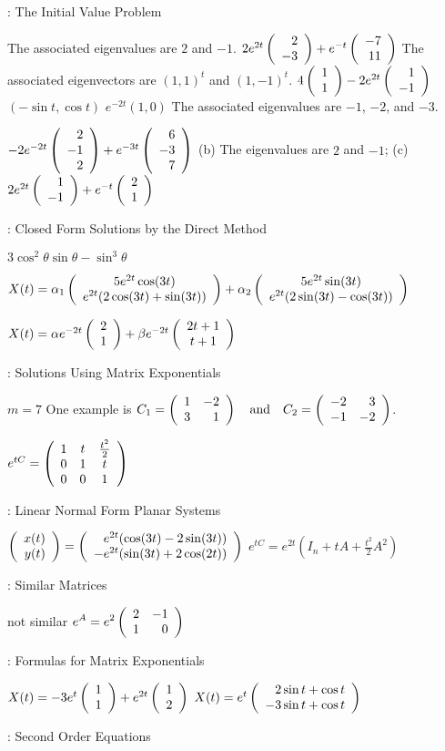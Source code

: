 :  The Initial Value Problem

\ans The associated eigenvalues are $2$ and $-1$.
 $2e^{2t}\left(\begin{array}{r} 2 \\ -3\end{array}\right) + e^{-t}\left(\begin{array}{r} -7 \\ 11\end{array}\right)$
 \ans The associated eigenvectors are $(1,1)^t$ and $(1,-1)^t$.
 $4\left(\begin{array}{r} 1 \\ 1\end{array}\right) - 2e^{2t}\left(\begin{array}{r} 1 \\ -1\end{array}\right)$
 $(-\sin t,\cos t)$
 \ans  $e^{-2t}(1,0)$
\ans The associated eigenvalues are $-1$, $-2$, and $-3$.

 \ans $-2e^{-2t}\left(\begin{array}{r} 2 \\ -1 \\ 2\end{array}\right) + e^{-3t}\left(\begin{array}{r} 6 \\ -3 \\ 7\end{array}\right)$
 (b) \ans The eigenvalues are $2$ and $-1$; 
(c) \ans $2e^{2t}\left(\begin{array}{r} 1 \\ -1\end{array}\right) + e^{-t}\left(\begin{array}{r} 2 \\ 1\end{array}\right)$


: Closed Form Solutions by the Direct Method

\ans $3\cos^2\theta\sin\theta - \sin^3\theta$

\ans $X(t) =
\alpha_1\left(\begin{array}{c} 5e^{2t}\cos(3t) \\ e^{2t}(2\cos(3t) + \sin(3t))\end{array}\right) +
\alpha_2\left(\begin{array}{c} 5e^{2t}\sin(3t) \\ e^{2t}(2\sin(3t) - \cos(3t))\end{array}\right)$

 \ans 
$X(t) = 
\alpha e^{-2t}\left(\begin{array}{c} 2 \\ 1\end{array}\right) + \beta e^{-2t}\left(\begin{array}{c} 2t + 1 \\ t + 1\end{array}\right)$


: Solutions Using Matrix Exponentials


 \ans $m = 7$
One example is $C_1 = \left(\begin{array}{rr} 1 & -2\\ 3 &1\end{array}\right) \quad\mbox{and}\quad C_2 = \left(\begin{array}{rr} -2 & 3\\ -1 &-2\end{array}\right)$.

 \ans $e^{tC} =
\left(\begin{array}{ccc} 1 & t & \frac{t^2}{2} \\ 0 & 1 & t \\ 0 & 0 & 1\end{array}\right)$


: Linear Normal Form Planar Systems


\ans  $\left(\begin{array}{r} x(t) \\ y(t)\end{array}\right) = \left(\begin{array}{r} e^{2t}(\cos(3t) - 2\sin(3t)) \\ -e^{2t}(\sin(3t) + 2\cos(2t))\end{array}\right)$
\ans $e^{tC} = e^{2t}(I_n + tA + \frac{t^2}{2}A^2)$



: Similar Matrices

\ans not similar
\ans $\displaystyle e^A = e^2\left(\begin{array}{rr} 2 & -1\\ 1 &0\end{array}\right)$


: Formulas for Matrix Exponentials


\ans $X(t) = -3e^t\left(\begin{array}{r} 1 \\ 1\end{array}\right) + e^{2t}\left(\begin{array}{r} 1 \\ 2\end{array}\right)$
\ans $X(t) = e^t\left(\begin{array}{r} 2\sin{t} + \cos{t} \\ -3\sin{t} + \cos{t}\end{array}\right)$


: Second Order Equations

